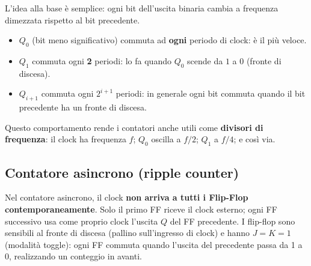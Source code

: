 \noindent L'idea alla base è semplice: ogni bit dell'uscita binaria cambia a frequenza dimezzata rispetto al bit precedente.
\begin{itemize}[leftmargin=1.5em]
    \item $Q_0$ (bit meno significativo) commuta ad \textbf{ogni} periodo di clock: è il più veloce.
    \item $Q_1$ commuta ogni \textbf{2} periodi: lo fa quando $Q_0$ scende da $1$ a $0$ (fronte di discesa).
    \item $Q_{i+1}$ commuta ogni $2^{i+1}$ periodi: in generale ogni bit commuta quando il bit precedente ha un fronte di discesa.
\end{itemize}
\noindent Questo comportamento rende i contatori anche utili come \textbf{divisori di frequenza}: il clock ha frequenza $f$; $Q_0$ oscilla a $f/2$; $Q_1$ a $f/4$; e così via.

\begin{center}
\end{center}

\subsection{Contatore asincrono (ripple counter)}

Nel contatore asincrono, il clock \textbf{non arriva a tutti i Flip-Flop contemporaneamente}. Solo il primo FF riceve il clock esterno; ogni FF successivo usa come proprio clock l'uscita $Q$ del FF precedente. I flip-flop sono sensibili al fronte di discesa (pallino sull'ingresso di clock) e hanno $J=K=1$ (modalità toggle): ogni FF commuta quando l'uscita del precedente passa da 1 a 0, realizzando un conteggio in avanti.

